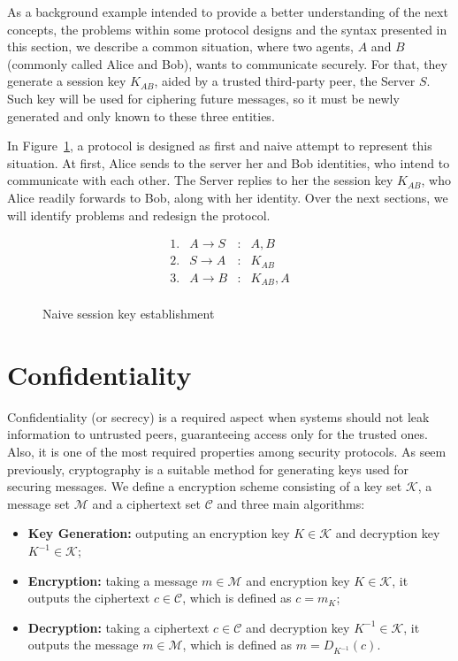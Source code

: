 As a background example intended to provide a better understanding of the next concepts, the problems within some protocol designs and the syntax presented in this section, we describe a common situation, where two agents, \(A\) and \(B\) (commonly called Alice and Bob), wants to communicate securely. For that, they generate a session key \(K_{AB}\), aided by a trusted third-party peer, the Server \(S\). Such key will be used for ciphering future messages, so it must be newly generated and only known to these three entities.

In Figure~\ref{prt:naive-session-key}, a protocol is designed as first and naive attempt to represent this situation. At first, Alice sends to the server her and Bob identities, who intend to communicate with each other. The Server replies to her the session key \(K_{AB}\), who Alice readily forwards to Bob, along with her identity. Over the next sections, we will identify problems and redesign the protocol.

\begin{figure}[ht]\label{prt:naive-session-key}
  \centering
  \[
    \begin{array}{rlcl}
      1. & A \longrightarrow S & : & A, B \\
      2. & S \longrightarrow A & : & K_{AB} \\
      3. & A \longrightarrow B & : & K_{AB}, A \\
    \end{array}
  \]
  \caption{Naive session key establishment}
\end{figure}





\section{Confidentiality}
Confidentiality (or secrecy) is a required aspect when systems should not leak information to untrusted peers, guaranteeing access only for the trusted ones. Also, it is one of the most required properties among security protocols. As seem previously, cryptography is a suitable method for generating keys used for securing messages. We define a encryption scheme consisting of a key set \(\mathcal{K}\), a message set \(\mathcal{M}\) and a ciphertext set \(\mathcal{C}\) and three main algorithms:

\begin{itemize}
  \item \textbf{Key Generation:} outputing an encryption key \(K \in \mathcal{K}\) and decryption key \(K^{-1} \in \mathcal{K}\);

  \item \textbf{Encryption:} taking a message \(m \in \mathcal{M}\) and encryption key \(K \in \mathcal{K}\), it outputs the ciphertext \(c \in \mathcal{C}\), which is defined as \(c = m_K\);

  \item \textbf{Decryption:} taking a ciphertext \(c \in \mathcal{C}\) and decryption key \(K^{-1} \in \mathcal{K}\), it outputs the message \(m \in \mathcal{M}\), which is defined as \(m = D_{K^{-1}}(c)\).
\end{itemize}

